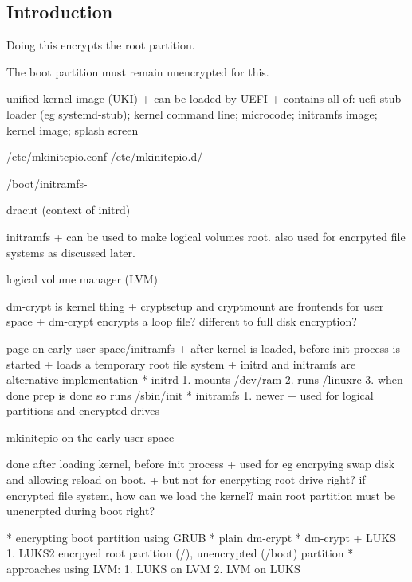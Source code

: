 
\subsection{Introduction}

Doing this encrypts the root partition.

The boot partition must remain unencrypted for this.

unified kernel image (UKI)
+ can be loaded by UEFI
+ contains all of: uefi stub loader (eg systemd-stub); kernel command line; microcode; initramfs image; kernel image; splash screen


/etc/mkinitcpio.conf
/etc/mkinitcpio.d/


/boot/initramfs-%

dracut (context of initrd)

initramfs
+ can be used to make logical volumes root. also used for encrpyted file systems as discussed later.

logical volume manager (LVM)


dm-crypt is kernel thing
+ cryptsetup and cryptmount are frontends for user space
+ dm-crypt encrypts a loop file? different to full disk encryption?

page on early user space/initramfs
+ after kernel is loaded, before init process is started
+ loads a temporary root file system
+ initrd and initramfs are alternative implementation
  * initrd
    1. mounts /dev/ram
    2. runs /linuxrc
    3. when done prep is done so runs /sbin/init
  * initramfs
    1. newer
+ used for logical partitions and encrypted drives


mkinitcpio on the early user space

done after loading kernel, before init process
+ used for eg encrpying swap disk and allowing reload on boot.
+ but not for encrpyting root drive right? if encrypted file system, how can we load the kernel? main root partition must be unencrpted during boot right?



  * encrypting boot partition using GRUB
  * plain dm-crypt
  * dm-crypt + LUKS
    1. LUKS2 encrpyed root partition (/), unencrypted (/boot) partition
  * approaches using LVM:
    1. LUKS on LVM
    2. LVM on LUKS
